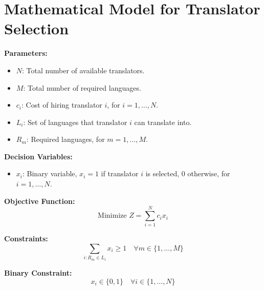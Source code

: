 \documentclass{article}
\begin{document}
\section*{Mathematical Model for Translator Selection}

\textbf{Parameters:}
\begin{itemize}
    \item $N$: Total number of available translators.
    \item $M$: Total number of required languages.
    \item $c_i$: Cost of hiring translator $i$, for $i = 1, \ldots, N$.
    \item $L_i$: Set of languages that translator $i$ can translate into.
    \item $R_m$: Required languages, for $m = 1, \ldots, M$.
\end{itemize}

\textbf{Decision Variables:}
\begin{itemize}
    \item $x_i$: Binary variable, $x_i = 1$ if translator $i$ is selected, $0$ otherwise, for $i = 1, \ldots, N$.
\end{itemize}

\textbf{Objective Function:}
\begin{equation}
    \text{Minimize } Z = \sum_{i=1}^{N} c_i x_i
\end{equation}

\textbf{Constraints:}
\begin{equation}
    \sum_{i: R_m \in L_i} x_i \geq 1 \quad \forall m \in \{1, \ldots, M\}
\end{equation}

\textbf{Binary Constraint:}
\begin{equation}
    x_i \in \{0, 1\} \quad \forall i \in \{1, \ldots, N\}
\end{equation}
\end{document}
